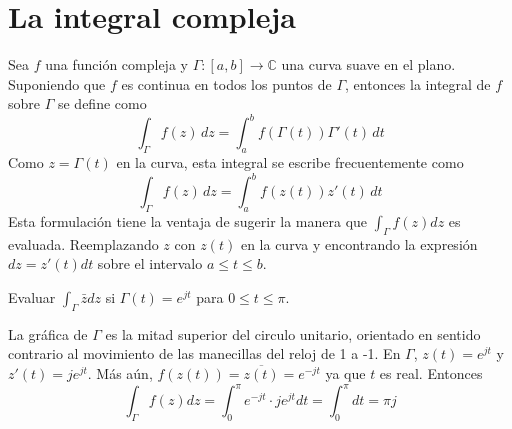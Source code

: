 \section{La integral compleja}

\begin{definition}
Sea $f$ una función compleja y $\Gamma:[a,b]\to\mathbb{C}$ una curva suave en el plano. Suponiendo que $f$ es continua en todos los puntos de $\Gamma$, entonces la integral de $f$ sobre $\Gamma$ se define como
$$
\int_\Gamma f(z)\,dz = \int_a^b f(\Gamma(t))\Gamma'(t)\,dt
$$
Como $z=\Gamma(t)$ en la curva, esta integral se escribe frecuentemente como
$$
\int_\Gamma f(z)\,dz = \int_a^b f(z(t))z'(t)\,dt
$$
Esta formulación tiene la ventaja de sugerir la manera que $\int_\Gamma f(z)dz$ es evaluada. Reemplazando $z$ con $z(t)$ en la curva y encontrando la expresión $dz=z'(t)dt$ sobre el intervalo $a\leqslant t\leqslant b$. 
\end{definition}

\begin{example}
  Evaluar $\int_\Gamma \bar{z} dz$ si $\Gamma(t)=e^{jt}$ para $0\leqslant t\leqslant \pi$.

  La gráfica de $\Gamma$ es la mitad superior del circulo unitario, orientado en sentido contrario al movimiento de las manecillas del reloj de 1 a -1. En $\Gamma$, $z(t)=e^{jt}$ y $z'(t)=je^{jt}$. Más aún, $f(z(t))=\overline{z(t)}=e^{-jt}$ ya que $t$ es real. Entonces 
  $$
  \int_\Gamma f(z)dz=\int_0^\pi e^{-jt}\cdot je^{jt}dt=\int_0^\pi dt = \pi j
  $$
\end{example}
